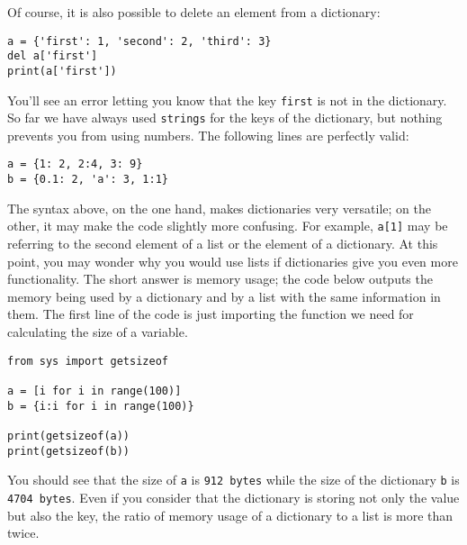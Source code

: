 
Of course, it is also possible to delete an element from a dictionary:

\begin{verbatim}
a = {'first': 1, 'second': 2, 'third': 3}
del a['first']
print(a['first'])
\end{verbatim}

You'll see an error letting you know that the key \texttt{first} is not in the dictionary. So far we have always used \texttt{strings} for the keys of the dictionary, but nothing prevents you from using numbers. The following lines are perfectly valid:

\begin{verbatim}
a = {1: 2, 2:4, 3: 9}
b = {0.1: 2, 'a': 3, 1:1}
\end{verbatim}

The syntax above, on the one hand, makes dictionaries very versatile; on the other, it may make the code slightly more confusing. For example, \texttt{a[1]} may be referring to the second element of a list or the element of a dictionary. At this point, you may wonder why you would use lists if dictionaries give you even more functionality. The short answer is memory usage; the code below outputs the memory being used by a dictionary and by a list with the same information in them. The first line of the code is just importing the function we need for calculating the size of a variable.

\begin{verbatim}
from sys import getsizeof

a = [i for i in range(100)]
b = {i:i for i in range(100)}

print(getsizeof(a))
print(getsizeof(b))
\end{verbatim}

You should see that the size of \texttt{a} is \texttt{912 bytes} while the size of the dictionary \texttt{b} is \texttt{4704 bytes}. Even if you consider that the dictionary is storing not only the value but also the key, the ratio of memory usage of a dictionary to a list is more than twice.

